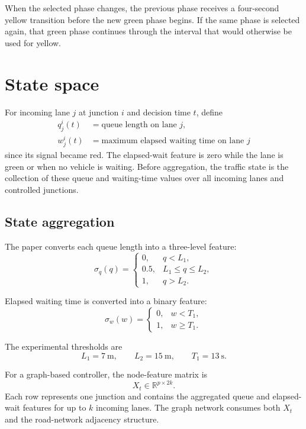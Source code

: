 \documentclass[11pt]{article}
\begin{document}
When the selected phase changes, the previous phase receives a four-second yellow transition before the new green phase begins. If the same phase is selected again, that green phase continues through the interval that would otherwise be used for yellow.

\section{State space}

For incoming lane $j$ at junction $i$ and decision time $t$, define
\begin{align}
q_j^i(t) &= \text{queue length on lane }j,\\
w_j^i(t) &= \text{maximum elapsed waiting time on lane }j
\end{align}
since its signal became red. The elapsed-wait feature is zero while the lane is green or when no vehicle is waiting. Before aggregation, the traffic state is the collection of these queue and waiting-time values over all incoming lanes and controlled junctions.

\subsection{State aggregation}

The paper converts each queue length into a three-level feature:
\begin{equation}
\sigma_q(q)=
\begin{cases}
0, & q<L_1,\\
0.5, & L_1\leq q\leq L_2,\\
1, & q>L_2.
\end{cases}
\end{equation}

Elapsed waiting time is converted into a binary feature:
\begin{equation}
\sigma_w(w)=
\begin{cases}
0, & w<T_1,\\
1, & w\geq T_1.
\end{cases}
\end{equation}

The experimental thresholds are
\begin{equation}
L_1=7\ \text{m}, \qquad L_2=15\ \text{m}, \qquad T_1=13\ \text{s}.
\end{equation}

For a graph-based controller, the node-feature matrix is
\begin{equation}
X_t\in\mathbb{R}^{p\times 2k}.
\end{equation}
Each row represents one junction and contains the aggregated queue and elapsed-wait features for up to $k$ incoming lanes. The graph network consumes both $X_t$ and the road-network adjacency structure.
\end{document}
